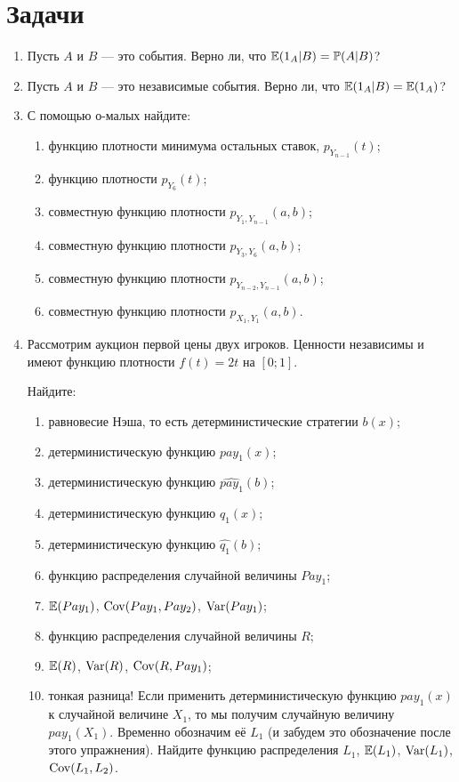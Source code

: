 
\section{Задачи}
\begin{enumerate}

\item Пусть $ A $ и $ B $ — это события. Верно ли, что $ \operatorname{\mathbb{E}}(1_{A}|B)=\operatorname{\mathbb{P}}(A|B) $?

\item Пусть $ A $ и $ B $ — это независимые события. Верно ли, что $ \operatorname{\mathbb{E}}(1_{A}|B)=\operatorname{\mathbb{E}}(1_{A})  $?

\item С помощью о-малых найдите: 

\begin{enumerate}
\item функцию плотности минимума остальных ставок, $ p_{Y_{n-1}}(t) $;
\item функцию плотности $ p_{Y_{6}}(t) $;
\item совместную функцию плотности $ p_{Y_{1},Y_{n-1}}(a,b) $;
\item совместную функцию плотности $ p_{Y_{3},Y_{6}}(a,b) $;
\item совместную функцию плотности $ p_{Y_{n-2},Y_{n-1}}(a,b) $;
\item совместную функцию плотности $ p_{X_{1},Y_{1}}(a,b) $.
\end{enumerate}

\item Рассмотрим аукцион первой цены двух игроков. Ценности независимы и имеют функцию плотности $f(t)=2t  $ на $ [0;1] $.

Найдите:
\begin{enumerate}
\item равновесие Нэша, то есть детерминистические стратегии $ b(x) $;
\item детерминистическую функцию $ pay_{1}(x) $;
\item детерминистическую функцию $ \widehat{pay_{1}}(b) $;
\item детерминистическую функцию $ q_{1}(x) $;
\item детерминистическую функцию $ \widehat{q_{1}}(b) $;
\item функцию распределения случайной величины $ Pay_{1} $;
\item $ \operatorname{\mathbb{E}}(Pay_{1}) $, $ \operatorname{Cov}(Pay_{1},Pay_{2}) $, $ \operatorname{Var}(Pay_{1}) $;
\item функцию распределения случайной величины $ R $;
\item $ \operatorname{\mathbb{E}}(R) $, $ \operatorname{Var}(R) $, $ \operatorname{Cov}(R,Pay_{1}) $;
\item тонкая разница! Если применить детерминистическую функцию $ pay_{1}(x) $ к случайной величине $ X_{1} $, то мы получим случайную величину $ pay_{1}(X_{1}) $. Временно обозначим её $ L_{1} $ (и забудем это обозначение после этого упражнения). Найдите функцию распределения $ L_{1} $, $ \operatorname{\mathbb{E}}(L_{1}) $, $ \operatorname{Var}(L_{1}) $, $ \operatorname{Cov}(L_{1},L_{2}) $.


\end{enumerate}
\end{enumerate}
